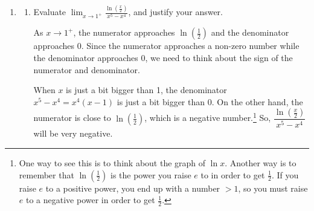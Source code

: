 \documentclass{article}
\theoremstyle{theorem}
\begin{document}
\begin{enumerate}
\begin{enumerate}
\begin{solution}
      Since $p(x)$ has degree 4, $p'(x)$ has degree 3, and $p''(x)$ has degree 2. So, we could have $p''(x)$ look like this parabola:
      \begin{center}
      \end{center}
      A possible formula for $p''(x)$ is $p''(x) = (x - 1)^2 = x^2 - 2x + 1$. Working backwards, we can think of a possible $p'(x)$ that has $x^2 - 2x + 1$ as its derivative: $p'(x) = \dfrac{x^3}{3} - x^2 + x$. Working backwards again, we can think of a possible $p(x)$: $p(x) = \boxed{\dfrac{x^4}{12} - \dfrac{x^3}{3} + \dfrac{x^2}{2}}$. 
    \end{solution}

  \end{enumerate}

\item {} 

  \begin{enumerate}
  \item %
    \begin{problem}[\vfill]
      Evaluate $\displaystyle \lim_{x \to 1^+} \frac{\ln \left( \frac{x}{2} \right)}{x^5-x^4}$, and justify your answer. 
    \end{problem}

    \begin{solution}
      As $x \to 1^+$, the numerator approaches $\ln \left( \frac{1}{2} \right)$ and the denominator approaches 0. Since the numerator approaches a non-zero number while the denominator approaches 0, we need to think about the sign of the numerator and denominator.

      When $x$ is just a bit bigger than 1, the denominator $x^5 - x^4 = x^4 (x - 1)$ is just a bit bigger than 0. On the other hand, the numerator is close to $\ln \left( \frac{1}{2} \right)$, which is a negative number.\footnote{One way to see this is to think about the graph of $\ln x$. Another way is to remember that $\ln \left( \frac{1}{2} \right)$ is the power you raise $e$ to in order to get $\frac{1}{2}$. If you raise $e$ to a positive power, you end up with a number $> 1$, so you must raise $e$ to a negative power in order to get $\frac{1}{2}$.} So, $\dfrac{\ln \left( \frac{x}{2} \right)}{x^5-x^4}$ will be very negative.


\end{solution}
\end{enumerate}
\end{enumerate}
\end{document}
